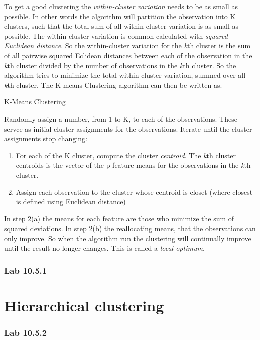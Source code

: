 To get a good clustering the \emph{within-cluster variation} needs to be as small as possible. In other words the algorithm will partition the observation into K clusters, such that the total sum of all within-cluster variation is as small as possible. The within-cluster variation is common calculated with \emph{squared Euclidean distance}.
So the within-cluster variation for the \emph{k}th cluster is the sum of all pairwise squared Eclidean distances between each of the observation in the \emph{k}th cluster divided by the number of observations in the \emph{k}th cluster.
So the algorithm tries to minimize the total within-cluster variation, summed over all \emph{k}th cluster.
The K-means Clustering algorithm can then be written as.

\begin{algorithm}
	\caption{K-Means Clustering}
	\label{algo:KMeansClustering}
	\begin{algorithmic}[1]
		\State Randomly assign a number, from 1 to K, to each of the observations. These servce as initial cluster assignments for the observations. 
		\State Iterate until the cluster assignments stop changing:
		\begin{enumerate}[label=(\alph*)]
			\item For each of the K cluster, compute the cluster \emph{centroid}. The \emph{k}th cluster centroids is the vector of the p feature means for the observations in the \emph{k}th cluster.
			\item Assign each observation to the cluster whose centroid is closet (where closest is defined using Euclidean distance) 
		\end{enumerate}
	\end{algorithmic}
\end{algorithm}

 In step 2(a) the means for each feature are those who minimize the sum of squared deviations. In step 2(b) the reallocating means, that the observations can only improve.
 So when the algorithm run the clustering will continually improve until the result no longer changes. This is called a \emph{local optimum}.
\subsection{Lab 10.5.1}

\chapter{Hierarchical clustering}

\subsection{Lab 10.5.2}